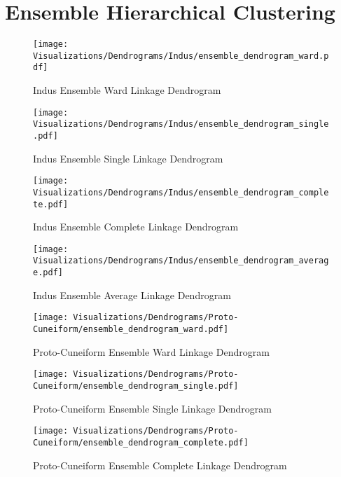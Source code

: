 \documentclass[11pt,a4paper,oneside]{report}
\begin{document}
\clearpage
\section{Ensemble Hierarchical Clustering}
\label{app: dendro}

\begin{figure}[H] 
    \centering
    \texttt{[image: Visualizations/Dendrograms/Indus/ensemble\_dendrogram\_ward.pdf]}
     \caption*{Indus Ensemble Ward Linkage Dendrogram}
\end{figure}

\begin{figure}[H] 
    \centering
    \texttt{[image: Visualizations/Dendrograms/Indus/ensemble\_dendrogram\_single.pdf]}
     \caption*{Indus Ensemble Single Linkage Dendrogram}
\end{figure}

\begin{figure}[H] 
    \centering
    \texttt{[image: Visualizations/Dendrograms/Indus/ensemble\_dendrogram\_complete.pdf]}
     \caption*{Indus Ensemble Complete Linkage Dendrogram}
\end{figure}

\begin{figure}[H] 
    \centering
    \texttt{[image: Visualizations/Dendrograms/Indus/ensemble\_dendrogram\_average.pdf]}
     \caption*{Indus Ensemble Average Linkage Dendrogram}
\end{figure}

\begin{figure}[H] 
    \centering
    \texttt{[image: Visualizations/Dendrograms/Proto-Cuneiform/ensemble\_dendrogram\_ward.pdf]}
     \caption*{Proto-Cuneiform Ensemble Ward Linkage Dendrogram}
\end{figure}

\begin{figure}[H] 
    \centering
    \texttt{[image: Visualizations/Dendrograms/Proto-Cuneiform/ensemble\_dendrogram\_single.pdf]}
     \caption*{Proto-Cuneiform Ensemble Single Linkage Dendrogram}
\end{figure}

\begin{figure}[H] 
    \centering
    \texttt{[image: Visualizations/Dendrograms/Proto-Cuneiform/ensemble\_dendrogram\_complete.pdf]}
     \caption*{Proto-Cuneiform Ensemble Complete Linkage Dendrogram}
\end{figure}
\end{document}
